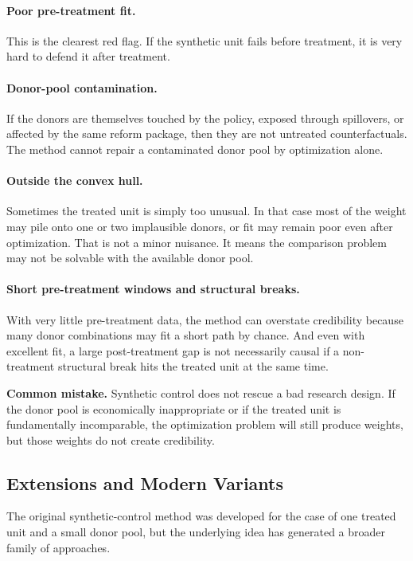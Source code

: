 \paragraph{Poor pre-treatment fit.}
This is the clearest red flag. If the synthetic unit fails before treatment, it is very hard to defend it after treatment.

\paragraph{Donor-pool contamination.}
If the donors are themselves touched by the policy, exposed through spillovers, or affected by the same reform package, then they are not untreated counterfactuals. The method cannot repair a contaminated donor pool by optimization alone.

\paragraph{Outside the convex hull.}
Sometimes the treated unit is simply too unusual. In that case most of the weight may pile onto one or two implausible donors, or fit may remain poor even after optimization. That is not a minor nuisance. It means the comparison problem may not be solvable with the available donor pool.

\paragraph{Short pre-treatment windows and structural breaks.}
With very little pre-treatment data, the method can overstate credibility because many donor combinations may fit a short path by chance. And even with excellent fit, a large post-treatment gap is not necessarily causal if a non-treatment structural break hits the treated unit at the same time.

\begin{boxF}
\textbf{Common mistake.}
Synthetic control does not rescue a bad research design. If the donor pool is economically inappropriate or if the treated unit is fundamentally incomparable, the optimization problem will still produce weights, but those weights do not create credibility.
\end{boxF}

\subsection{Extensions and Modern Variants}
The original synthetic-control method was developed for the case of one treated unit and a small donor pool, but the underlying idea has generated a broader family of approaches.


